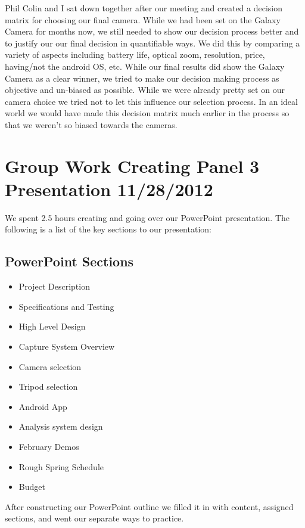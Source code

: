 \documentclass[]{article}
\begin{document}
	Phil Colin and I sat down together after our meeting and created a decision matrix for choosing our final camera. While we had been set on the Galaxy Camera for months now, we still needed to show our decision process better and to justify our our final decision in quantifiable ways.	We did this by comparing a variety of aspects including battery life, optical zoom, resolution, price, having/not the android OS, etc. While our final results did show the Galaxy Camera as a clear winner, we tried to make our decision making process as objective and un-biased as possible. While we were already pretty set on our camera choice we tried not to let this influence our selection process. In an ideal world we would have made this decision matrix much earlier in the process so that we weren't so biased towards the cameras. 
	
	\section{Group Work Creating Panel 3 Presentation 11/28/2012}
	
	We spent 2.5 hours creating and going over our PowerPoint presentation. The following is a list of the key sections to our presentation: \\
	
		\subsection{PowerPoint Sections}	
			\begin{itemize}
				\item Project Description
				\item Specifications and Testing
				\item High Level Design
				\item Capture System Overview
				\item Camera selection
				\item Tripod selection
				\item Android App
				\item Analysis system design
				\item February Demos
				\item Rough Spring Schedule
				\item Budget
			\end{itemize}
			
			After constructing our PowerPoint outline we filled it in with content, assigned sections, and went our separate ways to practice.			
			
\end{document}
